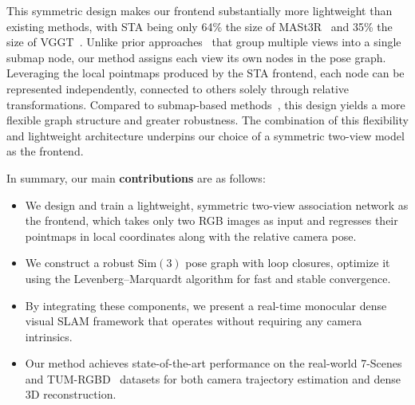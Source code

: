 This symmetric design makes our frontend substantially more lightweight than existing methods, with STA being only 64\% the size of MASt3R~\cite{mast3r} and 35\% the size of VGGT~\cite{wang2025vggt}.
Unlike prior approaches~\cite{maggio2025vggtslam,deng2025vggtlong} that group multiple views into a single submap node, our method assigns each view its own nodes in the pose graph. Leveraging the local pointmaps produced by the STA frontend, each node can be represented independently, connected to others solely through relative transformations. Compared to submap-based methods~\cite{maggio2025vggtslam}, this design yields a more flexible graph structure and greater robustness. The combination of this flexibility and lightweight architecture underpins our choice of a symmetric two-view model as the frontend.


In summary, our main \textbf{contributions} are as follows:
\begin{itemize}[itemsep=0pt,topsep=2pt,leftmargin=10pt,label=$\bullet$]
  \item We design and train a lightweight, symmetric two-view association network as the frontend, which takes only two RGB images as input and regresses their pointmaps in local coordinates along with the relative camera pose.
  \item We construct a robust $\mathrm{Sim}(3)$ pose graph with loop closures, optimize it using the Levenberg–Marquardt algorithm for fast and stable convergence.
  \item By integrating these components, we present a real-time monocular dense visual SLAM framework that operates without requiring any camera intrinsics.
  \item Our method achieves state-of-the-art performance on the real-world 7-Scenes~\cite{shotton2013-7scenes} and TUM-RGBD~\cite{sturm12tumrgbd} datasets for both camera trajectory estimation and dense 3D reconstruction.
\end{itemize}
